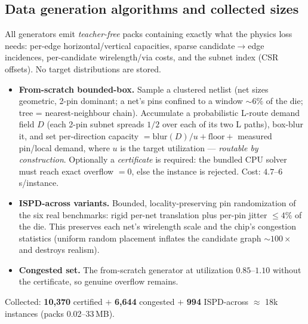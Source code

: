 \documentclass[11pt]{article}
\begin{document}
\subsection{Data generation algorithms and collected sizes}\label{sec:datagen}
All generators emit \emph{teacher-free} packs containing exactly what the
physics loss needs: per-edge horizontal/vertical capacities, sparse
candidate$\to$edge incidences, per-candidate wirelength/via costs, and the
subnet index (CSR offsets). No target distributions are stored.
\begin{itemize}\itemsep2pt
\item \textbf{From-scratch bounded-box.} Sample a clustered netlist (net
  sizes geometric, 2-pin dominant; a net's pins confined to a window
  ${\sim}6\%$ of the die; tree = nearest-neighbour chain). Accumulate a
  probabilistic L-route demand field $D$ (each 2-pin subnet spreads $1/2$
  over each of its two L paths), box-blur it, and set per-direction capacity
  $= \mathrm{blur}(D)/u + \text{floor} + $ measured pin/local demand, where
  $u$ is the target utilization --- \emph{routable by construction}.
  Optionally a \emph{certificate} is required: the bundled CPU solver must
  reach exact overflow $=0$, else the instance is rejected.
  Cost: $4.7$--$6$\,s/instance.
\item \textbf{ISPD-across variants.} Bounded, locality-preserving pin
  randomization of the six real benchmarks: rigid per-net translation plus
  per-pin jitter $\le 4\%$ of the die. This preserves each net's wirelength
  scale and the chip's congestion statistics (uniform random placement
  inflates the candidate graph ${\sim}100\times$ and destroys realism).
\item \textbf{Congested set.} The from-scratch generator at utilization
  $0.85$--$1.10$ without the certificate, so genuine overflow remains.
\end{itemize}
Collected: \textbf{10{,}370} certified $+$ \textbf{6{,}644} congested $+$
\textbf{994} ISPD-across $\approx$ 18k instances (packs 0.02--33\,MB).
\end{document}
